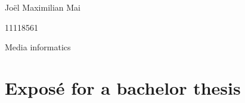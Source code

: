 % 
\begin{titlepage}
Joël Maximilian Mai 
\vspace{0.1cm}

11118561 
\vspace{0.1cm}

Media informatics 
\vspace{2cm}

\section*{Exposé for a bachelor thesis}
\vspace{0.4cm}

\begin{LARGE}
\textbf{\thesis} 	
\end{LARGE}

\vspace{2cm}
\tableofcontents

\end{titlepage}